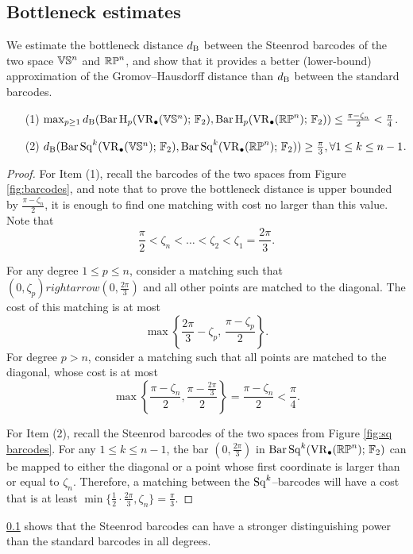 \subsection{Bottleneck estimates}\label{prop:db estimate}

We estimate the bottleneck distance $d_{\mathrm{B}}$ between the Steenrod barcodes of the two space $\mathbb{V}\mathbb{S}^n$ and $\mathbb{RP}^n$, and show that it provides a better (lower-bound) approximation of the Gromov--Hausdorff distance than $d_{\mathrm{B}}$ between the standard barcodes.

\medskip\theorem
\begin{itemize}
	\item[(1)] $\max_{p\geq 1}d_{\mathrm{B}}(\operatorname{Bar} \operatorname{H}_{p}(\operatorname{VR}_\bullet(\mathbb{V}\mathbb{S}^n);\,{\mathbb{F}_2}), \operatorname{Bar} \operatorname{H}_{p}(\operatorname{VR}_\bullet(\mathbb{RP}^n);\,{\mathbb{F}_2}))\leq \frac{\pi-\zeta_n}{2} < \frac{\pi}{4}$.
	\smallskip\item[(2)] $d_{\mathrm{B}}(\operatorname{Bar}\operatorname{Sq}^{k}(\operatorname{VR}_\bullet(\mathbb{V}\mathbb{S}^n);\,{\mathbb{F}_2}), \operatorname{Bar}\operatorname{Sq}^{k}(\operatorname{VR}_\bullet(\mathbb{RP}^n);\,{\mathbb{F}_2}))\geq \frac{\pi}{3},\forall 1\leq k\leq n-1$.
\end{itemize}

\begin{proof}
	For Item (1), recall the barcodes of the two spaces from Figure \ref{fig:barcodes}, and note that to prove the bottleneck distance is upper bounded by $\frac{\pi-\zeta_n}{2}$, it is enough to find one matching with cost no larger than this value.
	Note that
	\[
	\frac{\pi}{2} < \zeta_n < \dots < \zeta_2 < \zeta_1 =\frac{2\pi}{3}.
	\]
	
	For any degree $1\leq p\leq n$, consider a matching such that $(0,\zeta_p)rightarrow (0,\frac{2\pi}{3})$ and all other points are matched to the diagonal.
	The cost of this matching is at most
	\[
	\max\left\{\frac{2\pi}{3}-\zeta_p,\,\frac{\pi-\zeta_p}{2}\right\}.
	\]
	For degree $p>n$, consider a matching such that all points are matched to the diagonal, whose cost is at most
	\[
	\max\left\{\frac{\pi-\zeta_n}{2}, \frac{\pi-\frac{2\pi}{3}}{2}\right\} = \frac{\pi-\zeta_n}{2} < \frac{\pi}{4}.
	\]
	
	For Item (2), recall the Steenrod barcodes of the two spaces from Figure \ref{fig:sq barcodes}.
	For any $1\leq k\leq n-1$, the bar $(0,\frac{2\pi}{3})$ in $\operatorname{Bar}\operatorname{Sq}^{k}(\operatorname{VR}_\bullet(\mathbb{RP}^n);\,{\mathbb{F}_2})$ can be mapped to either the diagonal or a point whose first coordinate is larger than or equal to $\zeta_n$.
	Therefore, a matching between the $\operatorname{Sq}^k$--barcodes will have a cost that is at least $\min\{\frac{1}{2}\cdot\frac{2\pi}{3}, \zeta_n\} = \frac{\pi}{3}.$
\end{proof}

\cref{prop:db estimate} shows that the Steenrod barcodes can have a stronger distinguishing power than the standard barcodes in all degrees.